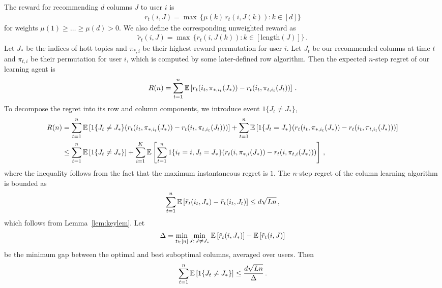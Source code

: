 The reward for recommending $d$ columns $J$ to user $i$ is
\begin{align*}
  r_t(i, J) =
  \max \, \{\mu(k) \, r_t(i, J(k)): k \in [d]\}
\end{align*}
for weights $\mu(1) \geq \dots \geq \mu(d) > 0$. We also define the corresponding unweighted reward as
\begin{align*}
  \tilde{r}_t(i, J) =
  \max \, \{r_t(i, J(k)): k \in [\text{length}(J)]\}\,.
\end{align*}
Let $J_\ast$ be the indices of hott topics and $\pi_{\ast, i}$ be their highest-reward permutation for user $i$. Let $J_t$ be our recommended columns at time $t$ and $\pi_{t, i}$ be their permutation for user $i$, which is computed by some later-defined row algorithm. Then the expected $n$-step regret of our learning agent is
\begin{align*}
  R(n) =
  \sum_{t = 1}^n \mathbb{E}\left[r_t(i_t, \pi_{\ast, i_t}(J_\ast)) - r_t(i_t, \pi_{t, i_t}(J_t))\right]\,.
\end{align*}
To decompose the regret into its row and column components, we introduce event $1\{J_t \neq J_\ast\}$,
\begin{align*}
  R(n)
  & = \sum_{t = 1}^n \mathbb{E}\left[1\{J_t \neq J_\ast\} (r_t(i_t, \pi_{\ast, i_t}(J_\ast)) - r_t(i_t, \pi_{t, i_t}(J_t)))\right] +
  \sum_{t = 1}^n \mathbb{E}\left[1\{J_t = J_\ast\} (r_t(i_t, \pi_{\ast, i_t}(J_\ast)) - r_t(i_t, \pi_{t, i_t}(J_\ast)))\right] \\
  & \leq \sum_{t = 1}^n \mathbb{E}\left[1\{J_t \neq J_\ast\}\right] +
  \sum_{i = 1}^K \mathbb{E}\left[\sum_{t = 1}^n 1\{i_t = i, J_t = J_\ast\} (r_t(i, \pi_{\ast, i}(J_\ast)) - r_t(i, \pi_{t, i}(J_\ast)))\right]\,,
\end{align*}
where the inequality follows from the fact that the maximum instantaneous regret is $1$. The $n$-step regret of the column learning algorithm is bounded as
\begin{align*}
  \sum_{t = 1}^n \mathbb{E}\left[\tilde{r}_t(i_t, J_\ast) - \tilde{r}_t(i_t, J_t)\right] \leq
  d \sqrt{L n}\,,
\end{align*}
which follows from Lemma~\ref{lem:keylem}. Let
\begin{align*}
  \Delta =
  \min_{t \in [n]} \min_{J:\, J \neq J_\ast} \mathbb{E}\left[\tilde{r}_t(i, J_\ast)\right] - \mathbb{E}\left[\tilde{r}_t(i, J)\right]
\end{align*}
be the minimum gap between the optimal and best suboptimal columns, averaged over users. Then
\begin{align*}
  \sum_{t = 1}^n \mathbb{E}\left[1\{J_t \neq J_\ast\}\right] \leq
  \frac{d \sqrt{L n}}{\Delta}\,.
\end{align*}
